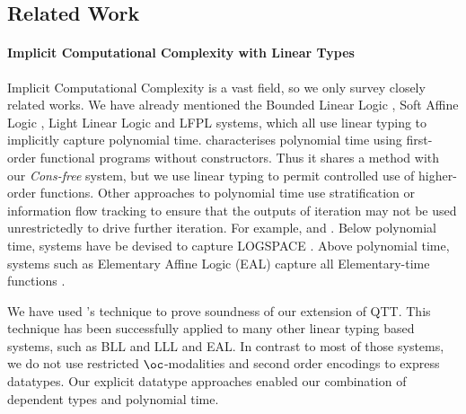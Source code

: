 \documentclass[acmsmall,screen]{acmart}
\newcommand{\ConsFree}{\emph{Cons-free}}
\begin{document}
\subsection{Related Work}

\paragraph{Implicit Computational Complexity with Linear Types}
Implicit Computational Complexity \cite{Lago11} is a vast field, so we
only survey closely related works. We have already mentioned the
Bounded Linear Logic \cite{bll92}, Soft Affine Logic \cite{Lafont04},
Light Linear Logic \cite{lll98} and LFPL \cite{hofmann99lfpl} systems,
which all use linear typing to implicitly capture polynomial
time. \citet{Jones01} characterises polynomial time using first-order
functional programs without constructors. Thus it shares a method with
our \ConsFree{} system, but we use linear typing to permit
controlled use of higher-order functions. Other approaches to
polynomial time use stratification or information flow tracking to
ensure that the outputs of iteration may not be used unrestrictedly to
drive further iteration. For example, \cite{BellantoniC92} and
\cite{HainryP23}. Below polynomial time, systems have be devised to
capture LOGSPACE \cite{LagoS16}. Above polynomial time, systems such
as Elementary Affine Logic (EAL) capture all Elementary-time functions
\cite{CoppolaM01}.

We have used \citet{dallago11realisability}'s technique to prove
soundness of our extension of QTT. This technique has been
successfully applied to many other linear typing based systems, such
as BLL \cite{hofmann04bll-realisability,dallago10bll} and LLL
\cite{LagoH10} and EAL. In contrast to most of those systems, we do
not use restricted $\oc$-modalities and second order encodings to
express datatypes. Our explicit datatype approaches enabled our
combination of dependent types and polynomial time.
\end{document}
